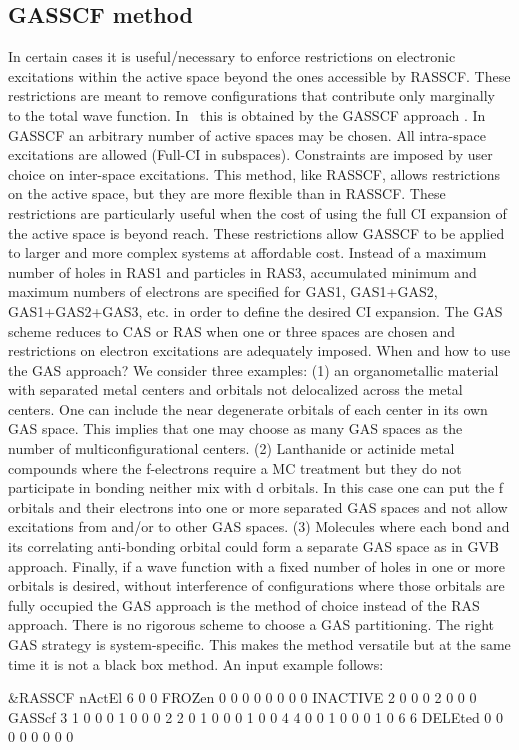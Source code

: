 \subsection{GASSCF method}

In certain cases it is useful/necessary to enforce restrictions on electronic
excitations within the active space beyond the ones accessible by RASSCF.
These restrictions are meant to remove configurations that contribute only
marginally to the total wave function.
In \molcas\ this is obtained by the GASSCF approach \cite{gas2011}.
In GASSCF an arbitrary number of active spaces may be chosen.
All intra-space excitations are allowed (Full-CI in subspaces).
Constraints are imposed by user choice on inter-space excitations.
This method, like RASSCF, allows restrictions on the active space,
but they are more flexible than in RASSCF.
These restrictions are particularly useful when the cost of using the full CI
expansion of the active space is beyond reach.
These restrictions allow GASSCF to be applied to larger and more complex systems
at affordable cost.
Instead of a maximum number of holes in RAS1 and particles in RAS3, accumulated
minimum and maximum numbers of electrons are specified for GAS1, GAS1+GAS2,
GAS1+GAS2+GAS3, etc. in order to define the desired CI expansion.
The GAS scheme reduces to CAS or RAS when one or three spaces are chosen and
restrictions on electron excitations are adequately imposed.
When and how to use the GAS approach?
We consider three examples: (1) an organometallic material with separated metal
centers and orbitals not delocalized across the metal centers. One can include
the near degenerate orbitals of each center in its own GAS space.
This implies that one may choose as many GAS spaces as the number of
multiconfigurational centers. (2) Lanthanide or actinide metal compounds where
the f-electrons require a MC treatment but they do not participate in bonding
neither mix with d orbitals.  In this case one can put the f orbitals and their
electrons into one or more separated GAS spaces and not allow excitations
from and/or to other GAS spaces. (3) Molecules where each bond and its correlating
anti-bonding orbital could form a separate GAS space as in GVB approach.
Finally, if a wave function with a fixed number of holes in one or more
orbitals is desired, without interference of configurations where those
orbitals are fully occupied the GAS approach is the method of choice instead
of the RAS approach. There is no rigorous scheme to choose a GAS partitioning.
The right GAS strategy is system-specific. This makes the method versatile but
at the same time it is not a black box method.
An input example follows:
\begin{inputlisting}
&RASSCF
nActEl
 6 0 0
FROZen
0 0 0 0 0 0 0 0
INACTIVE
2 0 0 0 2 0 0 0
GASScf
3
 1 0 0 0 1 0 0 0
2 2
 0 1 0 0 0 1 0 0
4 4
 0 0 1 0 0 0 1 0
6 6
DELEted
0 0 0 0 0 0 0 0
\end{inputlisting}

